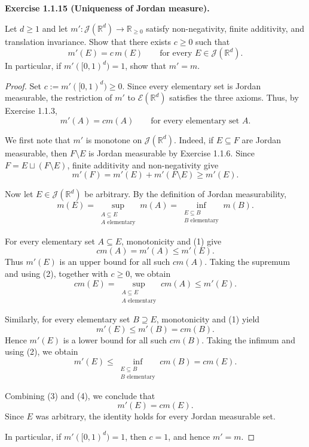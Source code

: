 \noindent\textbf{Exercise 1.1.15 (Uniqueness of Jordan measure).}\par

Let $d\geq1$ and let $m':\mathcal J(\mathbb R^d)\to\mathbb R_{\geq0}$ satisfy
non-negativity, finite additivity, and translation invariance.
Show that there exists $c\geq0$ such that
\[
  m'(E)=c\,m(E)\qquad \text{for every }E\in\mathcal J(\mathbb R^d).
\]
In particular, if $m'([0,1)^d)=1$, show that $m'=m$.

\begin{proof}
Set $c:=m'([0,1)^d)\geq 0$.
Since every elementary set is Jordan measurable,
the restriction of $m'$ to $\mathcal E(\mathbb R^d)$
satisfies the three axioms. Thus, by Exercise 1.1.3,
\begin{equation}
  m'(A)=cm(A)
  \qquad\text{for every elementary set }A.
  \tag{1}
\end{equation}

We first note that $m'$ is monotone on
$\mathcal J(\mathbb R^d)$. Indeed, if
$E\subseteq F$ are Jordan measurable, then
$F\setminus E$ is Jordan measurable by
Exercise 1.1.6. Since
$F=E\sqcup(F\setminus E)$, finite additivity
and non-negativity give
\[
  m'(F)=m'(E)+m'(F\setminus E)\geq m'(E).
\]

Now let $E\in\mathcal J(\mathbb R^d)$ be arbitrary.
By the definition of Jordan measurability,
\begin{equation}
 m(E)
 =\sup_{\substack{A\subseteq E\\ A\text{ elementary}}}m(A)
 =\inf_{\substack{E\subseteq B\\ B\text{ elementary}}}m(B).
 \tag{2}
\end{equation}

For every elementary set $A\subseteq E$,
monotonicity and (1) give
\[
  cm(A)=m'(A)\leq m'(E).
\]
Thus $m'(E)$ is an upper bound for all such
$cm(A)$. Taking the supremum and using (2),
together with $c\geq0$, we obtain
\begin{equation}
 cm(E)
 =\sup_{\substack{A\subseteq E\\ A\text{ elementary}}}cm(A)
 \leq m'(E).
 \tag{3}
\end{equation}

Similarly, for every elementary set $B\supseteq E$,
monotonicity and (1) yield
\[
  m'(E)\leq m'(B)=cm(B).
\]
Hence $m'(E)$ is a lower bound for all such
$cm(B)$. Taking the infimum and using (2),
we obtain
\begin{equation}
 m'(E)
 \leq\inf_{\substack{E\subseteq B\\ B\text{ elementary}}}cm(B)
 =cm(E).
 \tag{4}
\end{equation}

Combining (3) and (4), we conclude that
\[
  \boxed{m'(E)=cm(E).}
\]
Since $E$ was arbitrary, the identity holds
for every Jordan measurable set.

In particular, if $m'([0,1)^d)=1$, then
$c=1$, and hence $m'=m$.
\end{proof}
